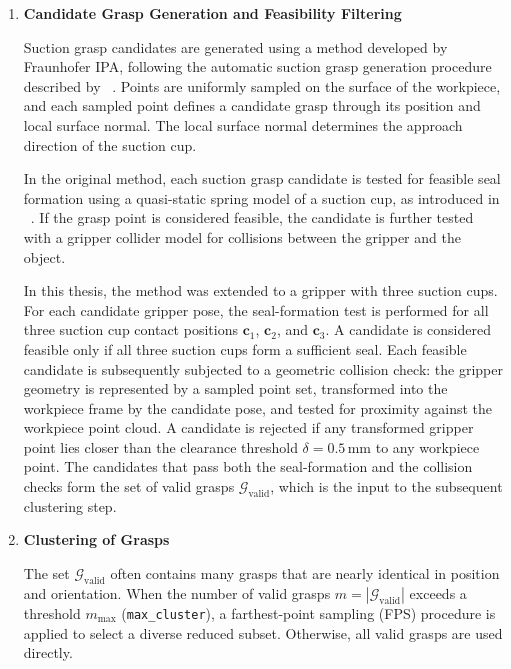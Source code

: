\begin{enumerate}
    \item \textbf{Candidate Grasp Generation and Feasibility Filtering}

    Suction grasp candidates are generated using a method developed by Fraunhofer IPA, following the automatic suction grasp generation procedure
    described by ~\cite{Kleeberger}. Points are uniformly sampled on the surface of the workpiece, and each sampled point defines a candidate grasp
    through its position and local surface normal. The local surface normal determines the approach direction of the suction cup.

    In the original method, each suction grasp candidate is tested for feasible seal formation using a quasi-static spring model of a suction cup, as
    introduced in ~\cite{SC_quasi_static}. If the grasp point is considered feasible, the candidate is further tested with a gripper collider model
    for collisions between the gripper and the object.

    In this thesis, the method was extended to a gripper with three suction cups. For each candidate gripper pose, the seal-formation test is
    performed for all three suction cup contact positions $\mathbf{c}_1$, $\mathbf{c}_2$, and $\mathbf{c}_3$. A candidate is considered feasible only
    if all three suction cups form a sufficient seal. Each feasible candidate is subsequently subjected to a geometric collision check: the gripper
    geometry is represented by a sampled point set, transformed into the workpiece frame by the candidate pose, and tested for proximity against the
    workpiece point cloud. A candidate is rejected if any transformed gripper point lies closer than the clearance threshold $\delta =
    0.5\,\mathrm{mm}$ to any workpiece point. The candidates that pass both the seal-formation and the collision checks form the set of valid grasps
    $\mathcal{G}_{\mathrm{valid}}$, which is the input to the subsequent clustering step.

\item \textbf{Clustering of Grasps}

The set $\mathcal{G}_{\mathrm{valid}}$ often contains many grasps that are nearly
identical in position and orientation. When the number of valid grasps
$m = |\mathcal{G}_{\mathrm{valid}}|$ exceeds a threshold $m_{\max}$
(\texttt{max\_cluster}), a farthest-point sampling (FPS) procedure is applied to select
a diverse reduced subset. Otherwise, all valid grasps are used directly.


\end{enumerate}
